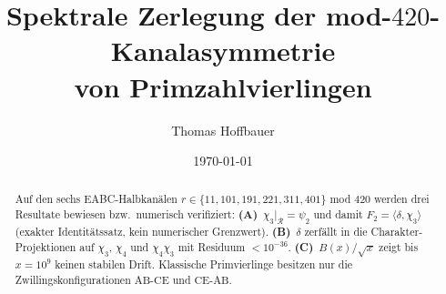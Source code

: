 \documentclass[11pt,a4paper]{article}
\title{Spektrale Zerlegung der mod-$420$-Kanalasymmetrie\\von Primzahlvierlingen}
\author{Thomas Hoffbauer}
\date{\today}
\begin{document}
\maketitle

\begin{abstract}
Auf den sechs EABC-Halbkanälen $r \in \{11,101,191,221,311,401\}$ mod $420$
werden drei Resultate bewiesen bzw.\ numerisch verifiziert:
\textbf{(A)}~$\chi_3|_{\mathcal{R}}=\psi_2$ und damit $F_2=\langle\delta,\chi_3\rangle$
(exakter Identitätssatz, kein numerischer Grenzwert).
\textbf{(B)}~$\delta$ zerfällt in die Charakter-Projektionen auf
$\chi_3$, $\chi_4$ und $\chi_4\chi_3$ mit Residuum $<10^{-36}$.
\textbf{(C)}~$B(x)/\sqrt{x}$ zeigt bis $x=10^9$ keinen stabilen Drift.
Klassische Primvierlinge besitzen nur die Zwillingskonfigurationen
$\mathrm{AB\text{-}CE}$ und $\mathrm{CE\text{-}AB}$.
\end{abstract}


\end{document}
